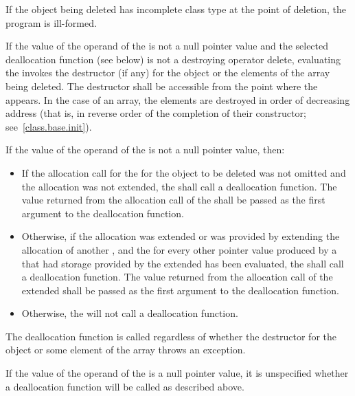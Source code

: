 \pnum
{}%
If the object being deleted has incomplete class type at the point of deletion,
the program is ill-formed.

\pnum
{}%
If the value of the operand of the  is not a
null pointer value
and the selected deallocation function (see below)
is not a destroying operator delete,
evaluating the  invokes the
destructor (if any) for the object or the elements of the array being
deleted.
The destructor shall be accessible from the point where
the  appears.
In the case of an array, the elements are destroyed in
order of decreasing address (that is, in reverse order of the completion
of their constructor; see~\ref{class.base.init}).

\pnum
If the value of the operand of the  is not a
null pointer value, then:

\begin{itemize}
\item
If the allocation call for the  for the object to
be deleted was not omitted and the allocation was not extended, the
 shall call a deallocation
function. The value returned from the
allocation call of the  shall be passed as the
first argument to the deallocation function.

\item
Otherwise, if the allocation was extended or was provided by extending the
allocation of another , and the
 for every other pointer value produced by a
 that had storage provided by the extended
 has been evaluated, the
 shall call a deallocation function. The value
returned from the allocation call of the extended 
shall be passed as the first argument to the deallocation function.

\item
Otherwise, the  will not call a
deallocation function.
\end{itemize}
\begin{note}
The deallocation function is called regardless of whether the destructor
for the object or some element of the array throws an exception.
\end{note}
If the value of the operand of the  is a
null pointer value, it is unspecified whether a deallocation function will be
called as described above.

